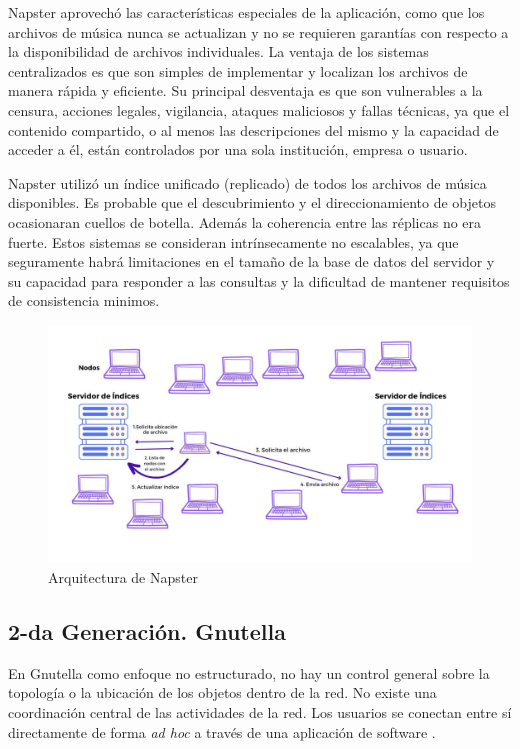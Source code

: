  Napster aprovechó las características especiales de la aplicación, como que los archivos de música nunca se actualizan y no se requieren garantías con respecto a la disponibilidad de archivos individuales.
 La ventaja de los sistemas centralizados es que son simples de implementar y localizan los archivos de manera rápida y eficiente.
 Su principal desventaja es que son vulnerables a la censura, acciones legales, vigilancia, ataques maliciosos y fallas técnicas, ya que el contenido compartido, o al menos las descripciones del mismo y la capacidad de acceder a él, están controlados por una sola institución, empresa o usuario. 
 
 Napster utilizó un índice unificado (replicado) de todos los archivos de música disponibles.  Es probable que el descubrimiento y el direccionamiento de objetos ocasionaran  cuellos de botella. 
  Adem\'as la coherencia entre las réplicas no era fuerte. Estos sistemas se consideran intrínsecamente no escalables, ya que seguramente habrá limitaciones en el tamaño de la base de datos del servidor y su capacidad para responder a las consultas y la dificultad de mantener requisitos de consistencia minimos.
 

 \begin{figure}%
 	\includegraphics {10/1.jpg } 
 	\caption{Arquitectura de Napster}
 	\label{fig:napster}
 \end{figure}

 
 
 \subsection{2-da Generación. Gnutella}
 
  
 
 En Gnutella como enfoque no estructurado, no hay un control general sobre la topología o la ubicación de los objetos dentro de la  red. No existe una coordinación central de las actividades de la red.
 Los usuarios se conectan entre sí directamente de forma \textit{ad hoc} a través de una aplicación de software  .
 
